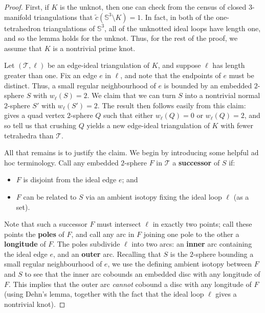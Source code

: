 \documentclass[10pt,a4paper]{amsart}
\newcommand{\tri}{\mathcal{T}}
\begin{document}
\begin{proof}
First, if $K$ is the unknot, then one can check from the census of closed $3$-manifold triangulations that $\tilde{c}(\mathbb{S}^3\setminus K) = 1$.
In fact, in both of the one-tetrahedron triangulations of $\mathbb{S}^3$, all of the unknotted ideal loops have length one, and so the lemma holds for the unknot.
Thus, for the rest of the proof, we assume that $K$ is a nontrivial prime knot.

Let $(\tri,\ell)$ be an edge-ideal triangulation of $K$, and suppose $\ell$ has length greater than one.
Fix an edge $e$ in $\ell$, and note that the endpoints of $e$ must be distinct.
Thus, a small regular neighbourhood of $e$ is bounded by an embedded $2$-sphere $S$ with $w_\ell(S)=2$.
We claim that we can turn $S$ into a nontrivial normal $2$-sphere $S'$ with $w_\ell(S')=2$.
The result then follows easily from this claim:
 gives a quad vertex $2$-sphere $Q$ such that either $w_\ell(Q)=0$ or $w_\ell(Q)=2$,
and so  tell us that crushing $Q$ yields a new edge-ideal triangulation of $K$ with fewer tetrahedra than $\tri$.

All that remains is to justify the claim.
We begin by introducing some helpful ad hoc terminology.
Call any embedded $2$-sphere $F$ in $\tri$ a \textbf{successor} of $S$ if:
\begin{itemize}
\item
$F$ is disjoint from the ideal edge $e$; and
\item
$F$ can be related to $S$ via an ambient isotopy fixing the ideal loop $\ell$ (as a set).
\end{itemize}
Note that such a successor $F$ must intersect $\ell$ in exactly two points;
call these points the \textbf{poles} of $F$, and call any arc in $F$ joining one pole to the other a \textbf{longitude} of $F$.
The poles subdivide $\ell$ into two arcs:
an \textbf{inner} arc containing the ideal edge $e$, and an \textbf{outer} arc.
Recalling that $S$ is the $2$-sphere bounding a small regular neighbourhood of $e$,
we use the defining ambient isotopy between $F$ and $S$ to see that the inner arc cobounds an embedded disc with any longitude of $F$.
This implies that the outer arc \emph{cannot} cobound a disc with any longitude of $F$ (using Dehn's lemma, together with the fact that the ideal loop $\ell$ gives a nontrivial knot).


\end{proof}
\end{document}
